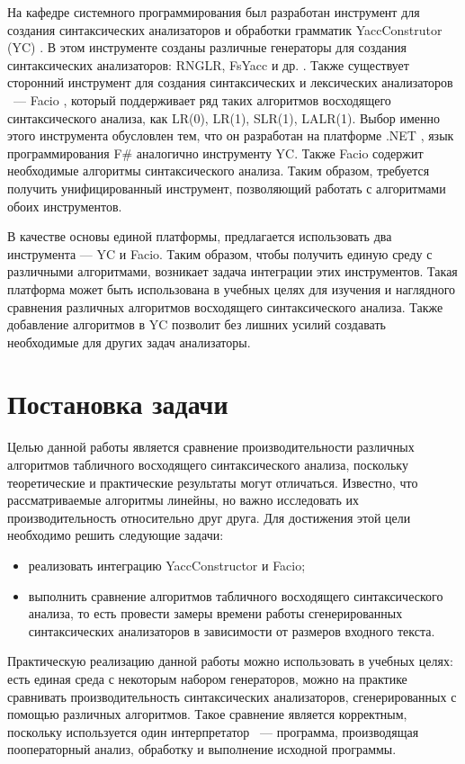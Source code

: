 \documentclass[14pt]{matmex-diploma}
\begin{document}
На кафедре системного программирования был разработан инструмент для создания синтаксических анализаторов и обработки грамматик YaccConstrutor (YC) \cite{link:yc}. В этом инструменте созданы различные генераторы для создания синтаксических анализаторов: RNGLR, FsYacc и др. \cite{link:yc}. Также существует сторонний инструмент для создания синтаксических и лексических анализаторов ~--- Facio \cite{link:facio}, который поддерживает ряд таких алгоритмов восходящего синтаксического анализа, как LR(0), LR(1), SLR(1), LALR(1). Выбор именно этого инструмента обусловлен тем, что он разработан на платформе .NET \cite{link:dotNet}, язык программирования F\# аналогично инструменту YC. Также Facio содержит необходимые алгоритмы синтаксического анализа. Таким образом, требуется получить унифицированный инструмент, позволяющий работать с алгоритмами обоих инструментов. 

В качестве основы единой платформы, предлагается использовать два инструмента — YC и Facio. Таким образом, чтобы получить единую среду с различными алгоритмами, возникает задача интеграции этих инструментов. Такая платформа может быть использована в учебных целях для изучения и наглядного сравнения различных алгоритмов восходящего синтаксического анализа. Также добавление алгоритмов в YC позволит без лишних усилий создавать необходимые для других задач анализаторы.

\section{Постановка задачи}
Целью данной работы является сравнение производительности различных алгоритмов табличного восходящего синтаксического анализа, поскольку теоретические и практические результаты могут отличаться. Известно, что рассматриваемые алгоритмы линейны, но важно исследовать их производительность относительно друг друга. Для достижения этой цели необходимо решить следующие задачи:
\begin{itemize}
\item
реализовать интеграцию YaccConstructor и Facio;
\item
выполнить сравнение алгоритмов табличного восходящего синтаксического анализа, то есть провести замеры времени работы сгенерированных синтаксических анализаторов в зависимости от размеров входного текста.
\end{itemize}

Практическую реализацию данной работы можно использовать в учебных целях: есть единая среда с некоторым набором генераторов, можно на практике сравнивать производительность синтаксических анализаторов, сгенерированных с помощью различных алгоритмов. Такое сравнение является корректным, поскольку используется один интерпретатор ~--- программа, производящая пооператорный анализ, обработку и выполнение исходной программы.
\end{document}
